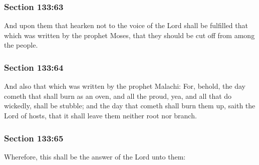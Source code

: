 	\subsubsection{Section 133:63} %
		\label{DC133-63}

		And upon them that hearken not to the voice of the Lord shall be fulfilled that which was written by the prophet Moses, that they should be cut off from among the people.


	\subsubsection{Section 133:64} %
		\label{DC133-64}

		And also that which was written by the prophet Malachi: For, behold, the day cometh that shall burn as an oven, and all the proud, yea, and all that do wickedly, shall be stubble; and the day that cometh shall burn them up, saith the Lord of hosts, that it shall leave them neither root nor branch.


	\subsubsection{Section 133:65} %
		\label{DC133-65}

		Wherefore, this shall be the answer of the Lord unto them:


